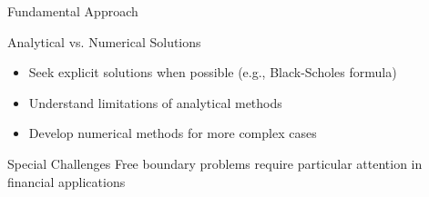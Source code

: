 \documentclass{beamer}
\begin{document}
\begin{frame}{Fundamental Approach}
    \begin{block}{Analytical vs. Numerical Solutions}
        \begin{itemize}
            \item Seek explicit solutions when possible (e.g., Black-Scholes formula)
            \item Understand limitations of analytical methods
            \item Develop numerical methods for more complex cases
        \end{itemize}
    \end{block}
    
    \begin{alertblock}{Special Challenges}
        Free boundary problems require particular attention in financial applications
    \end{alertblock}
\end{frame}
\end{document}

